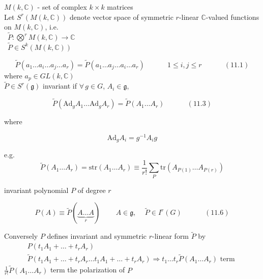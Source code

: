 \documentclass[twoside]{amsart}
\begin{document}
$M(k,\mathbb{C})$ - set of complex $k\times k$ matrices  \\

Let $S^r(M(k,\mathbb{C}))$ denote vector space of symmetric $r$-linear $\mathbb{C}$-valued functions on $M(k,\mathbb{C})$, i.e. \\
\quad \quad \, $\widetilde{P}: \bigotimes^r M(k,\mathbb{C}) \to \mathbb{C}$ \\
\quad \quad \quad \, $\widetilde{P} \in S^k(M(k,\mathbb{C}))$ 

\begin{equation}
  \widetilde{P}{ (a_1 \dots a_i \dots a_j \dots a_r ) } =\widetilde{ P}{ (a_1 \dots a_j \dots a_i \dots a_r) } \quad \quad \quad \, 1\leq i , j \leq r \quad \quad \quad \, (11.1)
\end{equation}
where $a_p \in GL(k,\mathbb{C})$ \\

$\widetilde{P} \in S^r(\mathfrak{g})$ invariant if $\forall \, g \in G$, $A_i \in \mathfrak{g}$, 

\begin{equation}
  \widetilde{P}{ (\text{Ad}_g{A_1} \dots \text{Ad}_g{A_r})} = \widetilde{P}(A_1 \dots A_r) \quad \quad \quad \, (11.3)
\end{equation}

where

\[
\text{Ad}_gA_i = g^{-1} A_i g
\]

e.g. 
\begin{equation}
  \widetilde{P}(A_1 \dots A_r) = \text{str}{ (A_1 \dots A_r)}  \equiv \frac{1}{r!} \sum_P \text{tr}{ (A_{ P(1)} \dots A_{P(r)} ) }
\end{equation}


invariant polynomial $P$ of degree $r$

\begin{equation}
  P(A) \equiv \widetilde{P}( \underbrace{ A \dots A }_{ r } ) \quad \quad \, A \in \mathfrak{g}, \quad \, \widetilde{P} \in I^r(G) \quad \quad \quad \, (11.6)
\end{equation}

Conversely $P$ defines invariant and symmetric $r$-linear form $\widetilde{P}$ by 
\[
\begin{gathered}
  P(t_1A_1 + \dots + t_r A_r ) \\ 
  \widetilde{P}(t_1 A_1 + \dots + t_r A_r \dots t_1 A_1 + \dots + t_r A_r ) \Longrightarrow t_1 \dots t_r \widetilde{P}(A_1 \dots A_r) \text{ term }
\end{gathered}
\]
$\frac{1}{r!} \widetilde{P}(A_1 \dots A_r)$ term the polarization of $P$
\end{document}
